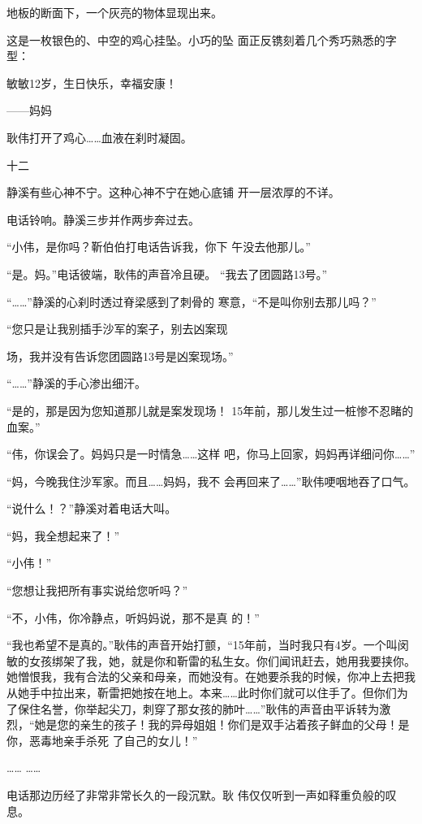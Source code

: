 \documentclass{article}
\begin{document}
地板的断面下，一个灰亮的物体显现出来。 

这是一枚银色的、中空的鸡心挂坠。小巧的坠
面正反镌刻着几个秀巧熟悉的字型： 


敏敏12岁，生日快乐，幸福安康！ 

\newpage


——妈妈 


耿伟打开了鸡心……血液在刹时凝固。 


十二 

静溪有些心神不宁。这种心神不宁在她心底铺
开一层浓厚的不详。 


电话铃响。静溪三步并作两步奔过去。 

“小伟，是你吗？靳伯伯打电话告诉我，你下
午没去他那儿。” 

“是。妈。”电话彼端，耿伟的声音冷且硬。
“我去了团圆路13号。” 

“……”静溪的心刹时透过脊梁感到了刺骨的
寒意，“不是叫你别去那儿吗？” 

“您只是让我别插手沙军的案子，别去凶案现
\newpage

场，我并没有告诉您团圆路13号是凶案现场。” 


“……”静溪的手心渗出细汗。 

“是的，那是因为您知道那儿就是案发现场！
15年前，那儿发生过一桩惨不忍睹的血案。” 

“伟，你误会了。妈妈只是一时情急……这样
吧，你马上回家，妈妈再详细问你……” 

“妈，今晚我住沙军家。而且……妈妈，我不
会再回来了……”耿伟哽咽地吞了口气。 


“说什么！？”静溪对着电话大叫。 


“妈，我全想起来了！” 


“小伟！” 


“您想让我把所有事实说给您听吗？” 

\newpage

“不，小伟，你冷静点，听妈妈说，那不是真
的！” 

“我也希望不是真的。”耿伟的声音开始打颤，“15年前，当时我只有4岁。一个叫闵敏的女孩绑架了我，她，就是你和靳雷的私生女。你们闻讯赶去，她用我要挟你。她憎恨我，我有合法的父亲和母亲，而她没有。在她要杀我的时候，你冲上去把我从她手中拉出来，靳雷把她按在地上。本来……此时你们就可以住手了。但你们为了保住名誉，你举起尖刀，刺穿了那女孩的肺叶……”耿伟的声音由平诉转为激烈，“她是您的亲生的孩子！我的异母姐姐！你们是双手沾着孩子鲜血的父母！是你，恶毒地亲手杀死
了自己的女儿！” 


…… …… 

电话那边历经了非常非常长久的一段沉默。耿
伟仅仅听到一声如释重负般的叹息。 
\end{document}

